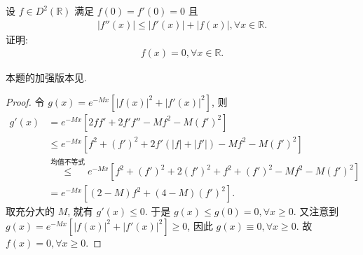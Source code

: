 \documentclass[../../main.tex]{subfiles}%
\begin{document}
\begin{example}
设 $f\in D^2(\mathbb{R})$ 满足 $f(0)=f'(0)=0$ 且
\begin{align*}
|f''(x)|\leqslant|f'(x)|+|f(x)|,\forall x\in\mathbb{R}.
\end{align*}
证明:
\begin{align*}
f(x)=0,\forall x\in\mathbb{R}.
\end{align*} 
\end{example}
\begin{note}
本题的加强版本见.
\end{note}
\begin{proof}

令 $g(x)=e^{-Mx}\left[|f(x)|^2+|f'(x)|^2\right]$, 则
\begin{align*}
g'(x)&=e^{-Mx}\left[2ff'+2f'f''-Mf^2-M(f')^2\right]\\
&\leqslant e^{-Mx}\left[f^2+(f')^2+2f'\left(|f|+|f'|\right)-Mf^2-M(f')^2\right]\\
&\overset{\text{均值不等式}}{\leqslant} e^{-Mx}\left[f^2+(f')^2+2(f')^2+f^2+(f')^2-Mf^2-M(f')^2\right]\\
&=e^{-Mx}\left[(2 - M)f^2+(4 - M)(f')^2\right].
\end{align*}
取充分大的 $M$, 就有 $g'(x)\leqslant0$. 于是 $g(x)\leqslant g(0)=0,\forall x\geqslant0$.
又注意到 $g(x)=e^{-Mx}\left[|f(x)|^2+|f'(x)|^2\right]\geqslant0$, 因此 $g(x)\equiv0,\forall x\geqslant0$.
故 $f(x)=0,\forall x\geqslant0$. 

\end{proof}
\end{document}
